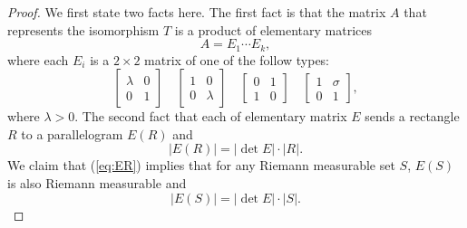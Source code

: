 \documentclass[11pt]{article}
\begin{document}
\begin{proof}
  We first state two facts here.  The first fact is that the matrix $A$ that represents the isomorphism $T$ is a product of elementary matrices
  \[
    A = E_1 \cdots E_k,
  \]
  where each $E_i$ is a $2 \times 2$ matrix of one of the follow types:
  \[
    \begin{bmatrix}
      \lambda & 0 \\ 0 & 1
    \end{bmatrix} \quad
    \begin{bmatrix}
      1 & 0 \\ 0 & \lambda 
    \end{bmatrix} \quad 
    \begin{bmatrix}
      0 & 1 \\ 1 & 0 
    \end{bmatrix} \quad
    \begin{bmatrix}
      1 & \sigma \\ 0 & 1
    \end{bmatrix},
  \]
  where $\lambda > 0$.  The second fact that each of elementary matrix $E$ sends a rectangle $R$ to a parallelogram $E(R)$ and
  \begin{equation}
    \label{eq:ER}
    |E(R)| = |\det E| \cdot |R|.
  \end{equation}
  We claim that (\ref{eq:ER}) implies that for any Riemann measurable set $S$, $E(S)$ is also Riemann measurable and
  \begin{equation}
    \label{eq:ES}
    |E(S)| = |\det E| \cdot |S|.
  \end{equation}


\end{proof}
\end{document}
